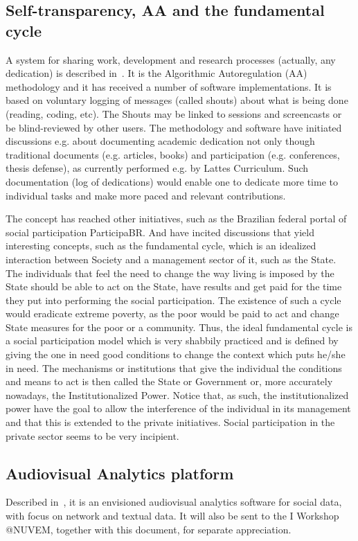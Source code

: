 \documentclass[letterpaper,10pt]{article}
\begin{document}
\subsection{Self-transparency, AA and the fundamental cycle}\label{self}
A system for sharing work, development and research processes
(actually, any dedication)
is described in~\cite{aa,aa2}.
It is the Algorithmic Autoregulation (AA) methodology and it has
received a number of software implementations.
It is based on voluntary logging of messages (called shouts)
about what is being done (reading, coding, etc).
The Shouts may
be linked to sessions and screencasts or be blind-reviewed
by other users.
The methodology and software have initiated discussions
e.g. about documenting academic dedication not only though
traditional documents (e.g. articles, books) and participation (e.g. conferences, thesis defense),
as currently performed e.g. by Lattes Curriculum.
Such documentation (log of dedications)
would enable one to dedicate more time to individual
tasks and make more paced and relevant contributions.

The concept has reached other initiatives, such
as the Brazilian federal portal of social participation
ParticipaBR.
And have incited discussions that yield interesting concepts,
such as the fundamental cycle,
which is an idealized interaction between
Society and a management sector of it,
such as the State.
The individuals that feel the need to
change the way living is imposed by the State
should be able to act on the State,
have results and get paid for the time they put
into performing the social participation.
The existence of such a cycle would eradicate
extreme poverty, as the poor would be paid
to act and change State measures for the poor
or a community.
Thus, the ideal fundamental cycle is a social
participation model which is very shabbily practiced
and is defined by giving the one in need good conditions
to change the context which puts he/she in need.
The mechanisms or institutions that give the
individual the conditions and means to act
is then called the State or Government or,
more accurately nowadays, the Institutionalized Power.
Notice that, as such, the institutionalized power
have the goal to allow the interference 
of the individual in its management
and that this is extended to the private initiatives.
Social participation in the private sector
seems to be very incipient.



\subsection{Audiovisual Analytics platform}
Described in~\cite{nuvem2}, it is an envisioned audiovisual analytics
software for social data, with focus on network and textual data.
It will also be sent to the I Workshop @NUVEM, together with
this document, for separate appreciation.
\end{document}
